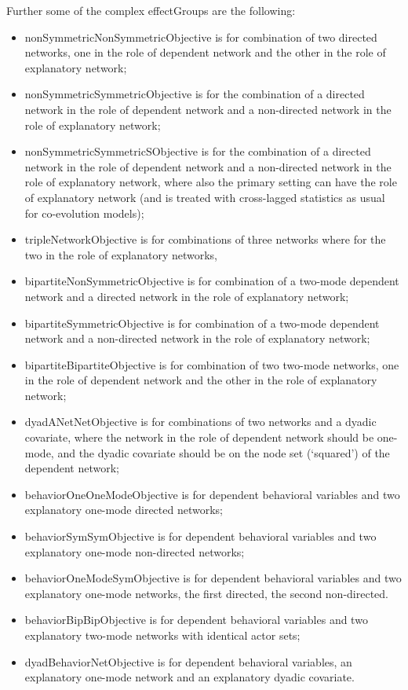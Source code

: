 \documentclass[a4paper,fleqn,11pt]{article}
\newcommand{\+}{\, + \,}
\newcommand{\sfn}[1]{\textsf{#1}}
\begin{document}
Further some of the complex effectGroups are the following:
\begin{itemize}
\item \sfn{nonSymmetricNonSymmetricObjective} is for combination of two
    directed networks, one in the role of dependent network and the other
    in the role of explanatory network;
\item \sfn{nonSymmetricSymmetricObjective} is for the combination of a
    directed network in the role of dependent network and a non-directed network
    in the role of explanatory network;
\item \sfn{nonSymmetricSymmetricSObjective} is for the combination of a
    directed network in the role of dependent network and a non-directed network
    in the role of explanatory network, where also the primary setting
    can have the role of explanatory network (and is treated with cross-lagged
    statistics as usual for co-evolution models);
\item \sfn{tripleNetworkObjective} is for combinations
    of three networks where for the two in the role of explanatory networks,
\item \sfn{bipartiteNonSymmetricObjective} is for combination of
    a two-mode dependent network and a directed network
    in the role of explanatory network;
\item \sfn{bipartiteSymmetricObjective} is for combination of
    a two-mode dependent network and a non-directed network
    in the role of explanatory network;
\item \sfn{bipartiteBipartiteObjective} is for combination of two
    two-mode networks, one in the role of dependent network and the other
    in the role of explanatory network;
\item \sfn{dyadANetNetObjective} is for combinations
    of two networks and a dyadic covariate, where the network in the role
    of dependent network should be one-mode, and the dyadic covariate
    should be on the node set (`squared') of the dependent network;
\item \sfn{behaviorOneOneModeObjective} is for dependent behavioral variables and
    two explanatory one-mode directed networks;
\item \sfn{behaviorSymSymObjective} is for dependent behavioral variables and
    two explanatory one-mode non-directed networks;
\item \sfn{behaviorOneModeSymObjective} is for dependent behavioral variables and
    two explanatory one-mode networks, the first directed, the second non-directed.
\item \sfn{behaviorBipBipObjective} is for dependent behavioral variables and
    two explanatory two-mode networks with identical actor sets;
\item \sfn{dyadBehaviorNetObjective} is for dependent behavioral variables,
   an explanatory one-mode network and an explanatory dyadic covariate.
\end{itemize}
\end{document}
